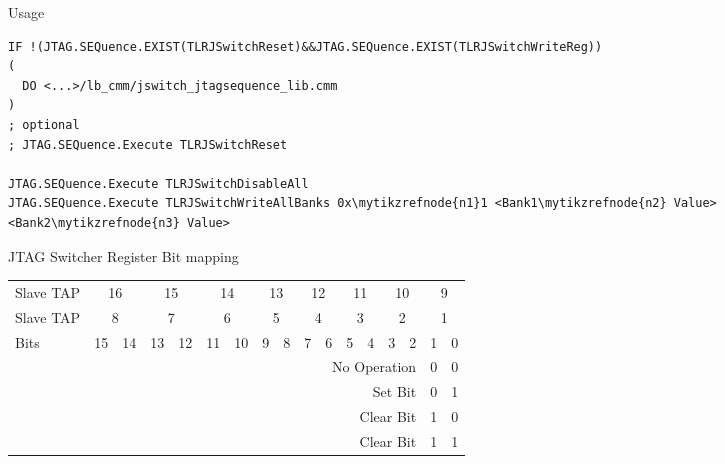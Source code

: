 \documentclass[aspectratio=169,12pt]{beamer}
\begin{document}
\begin{frame}[fragile]{Usage}
\begin{Verbatim}[fontsize=\tiny,commandchars=\\\{\}]
IF !(JTAG.SEQuence.EXIST(TLRJSwitchReset)&&JTAG.SEQuence.EXIST(TLRJSwitchWriteReg))
(
  DO <...>/lb_cmm/jswitch_jtagsequence_lib.cmm
)
; optional
; JTAG.SEQuence.Execute TLRJSwitchReset

JTAG.SEQuence.Execute TLRJSwitchDisableAll
JTAG.SEQuence.Execute TLRJSwitchWriteAllBanks 0x\mytikzrefnode{n1}1 <Bank1\mytikzrefnode{n2} Value> <Bank2\mytikzrefnode{n3} Value>
\end{Verbatim}
JTAG Switcher Register Bit mapping
\begin{footnotesize}
\begin{tabular}{l|c|c|c|c|c|c|c|c|c|c|c|c|c|c|c|c}
Slave TAP & \multicolumn{2}{c|}{16} & \multicolumn{2}{c|}{15} & \multicolumn{2}{c|}{14} & \multicolumn{2}{c|}{13} & \multicolumn{2}{c|}{12} & \multicolumn{2}{c|}{11} & \multicolumn{2}{c|}{10} & \multicolumn{2}{c}{9}\\
Slave TAP & \multicolumn{2}{c|}{8} & \multicolumn{2}{c|}{7} & \multicolumn{2}{c|}{6} & \multicolumn{2}{c|}{5} & \multicolumn{2}{c|}{4} & \multicolumn{2}{c|}{3} & \multicolumn{2}{c|}{2} & \multicolumn{2}{c}{1}\\
\hline
Bits & 15 & 14 & 13 & 12 & 11 & 10 & 9 & 8 & 7 & 6 & 5 & 4 & 3 & 2 & 1 & 0\\
\hline \hline
\multicolumn{15}{r|}{No Operation} & 0 & 0\\
\multicolumn{15}{r|}{Set Bit} & 0 & 1\\
\multicolumn{15}{r|}{Clear Bit} & 1 & 0\\
\multicolumn{15}{r|}{Clear Bit} & 1 & 1
\end{tabular}
\end{footnotesize}
\end{frame}
\end{document}
